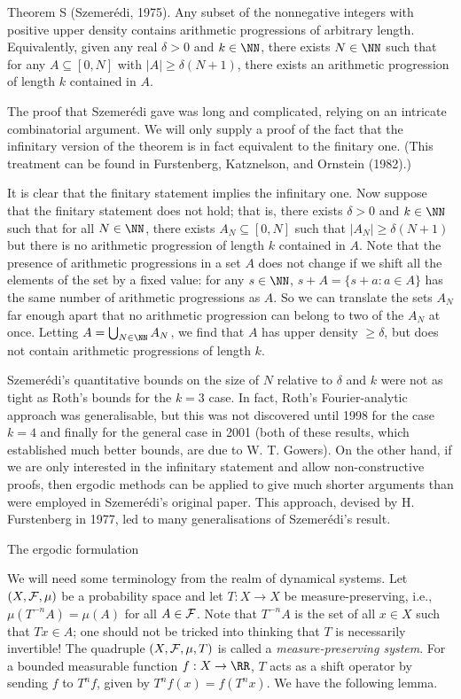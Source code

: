 \parenproclaim Theorem S (Szemer\'edi, {\rm 1975}). Any subset of the nonnegative integers with positive upper
density contains arithmetic progressions of arbitrary length. Equivalently, given any real $\delta > 0$ and
$k\in \NN$, there exists $N\in \NN$ such that for any $A\subseteq [0,N]$ with $|A|\geq \delta(N+1)$, there exists
an arithmetic progression of length $k$ contained in $A$.

\noindent
The proof that Szemer\'edi gave was long and complicated, relying on an intricate combinatorial argument.
We will only supply a proof of the fact
that the infinitary version of the theorem is in fact equivalent to the finitary one. (This treatment
can be found in Furstenberg, Katznelson, and Ornstein (1982).)

\proof It is clear that the finitary statement implies the infinitary one. Now suppose that the finitary
statement does not hold; that is, there exists $\delta>0$ and $k\in \NN$ such that for all $N\in \NN$,
there exists $A_N\subseteq [0,N]$ such that $|A_N|\geq \delta(N+1)$ but there is no arithmetic progression
of length $k$ contained in $A$. Note that the presence of arithmetic progressions in a set $A$ does not
change if we shift all the elements of the set by a fixed value: for any $s\in \NN$,
$s+A = \{s + a : a\in A\}$ has the
same number of arithmetic progressions as $A$. So we can translate the sets $A_N$ far enough apart that no
arithmetic progression can belong to two of the $A_N$ at once. Letting $A = \bigcup_{N\in \NN} A_N$,
we find that $A$ has upper density $\geq \delta$, but does not contain arithmetic progressions of length $k$.\slug

Szemer\'edi's quantitative bounds on the size of $N$ relative to $\delta$ and $k$ were not as tight
as Roth's bounds for the $k=3$ case. In fact, Roth's Fourier-analytic approach was generalisable,
but this was not discovered until 1998 for the case
$k=4$ and finally for the general case in 2001 (both of these results, which established much better bounds,
are due to W. T. Gowers). On the other
hand, if we are only interested in the infinitary statement and allow non-constructive proofs, then ergodic
methods can be applied to give much shorter arguments than were employed in Szemer\'edi's original paper.
This approach, devised by H. Furstenberg in 1977, led to many generalisations of Szemer\'edi's result.

\advsect The ergodic formulation

We will need some terminology from the realm of dynamical systems.
Let $(X,{\cal F},\mu)$ be a probability space and let $T:X\to X$ be measure-preserving, i.e.,
$\mu(T^{-n} A) = \mu(A)$ for all $A\in {\cal F}$. Note that $T^{-n}A$ is the set of all $x\in X$ such that $Tx\in A$;
one should not be tricked into thinking that $T$ is necessarily invertible!
The quadruple $(X,{\cal F},\mu,T)$ is called a {\it measure-preserving
system}. For a bounded measurable function $f:X\to\RR$, $T$ acts as a shift operator by sending $f$ to $T^n f$,
given by $T^nf(x) = f(T^nx)$. We have the following lemma.

